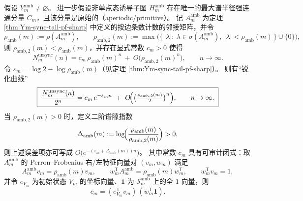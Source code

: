 \begin{theorem}\label{thm:Ym-unsync-prefix-pf-sharp}
假设 \(Y_m^{\mathrm{amb}}\neq\varnothing\)。
进一步假设非单点态诱导子图 \(H_m^{\mathrm{amb}}\) 存在唯一的最大谱半径强连通分量 \(C_m\)，且该分量是原始的（aperiodic/primitive）。
记 \(A_m^{\mathrm{amb}}\) 为定理 \ref{thm:Ym-sync-tail-pf-sharp} 中定义的按边条数计数的邻接矩阵，并令
\[
\rho_{\mathrm{amb}}(m):=\rho(A_m^{\mathrm{amb}}),\qquad
\rho_{\mathrm{amb},2}(m):=\max\bigl(\{\,|\lambda|:\ \lambda\in\sigma(A_m^{\mathrm{amb}}),\ |\lambda|<\rho_{\mathrm{amb}}(m)\,\}\cup\{0\}\bigr),
\]
则 \(\rho_{\mathrm{amb},2}(m)<\rho_{\mathrm{amb}}(m)\)，并存在显式常数 \(c_m>0\) 使得
\[
\boxed{\;
N_m^{\mathrm{unsync}}(n)
=c_m\,\rho_{\mathrm{amb}}(m)^{n}\ +\ O\!\bigl(\rho_{\mathrm{amb},2}(m)^{n}\bigr),
\qquad n\to\infty.\;}
\]
令 \(\varepsilon_m=\log 2-\log\rho_{\mathrm{amb}}(m)\)（见定理 \ref{thm:Ym-sync-tail-pf-sharp}）。
则有“锐化曲线”
\[
\boxed{\;
\frac{N_m^{\mathrm{unsync}}(n)}{2^n}
=c_m\,e^{-\varepsilon_m n}\ +\ O\!\Bigl(\bigl(\tfrac{\rho_{\mathrm{amb},2}(m)}{2}\bigr)^{n}\Bigr),
\qquad n\to\infty.\;}
\]
当 \(\rho_{\mathrm{amb},2}(m)>0\) 时，定义二阶谱隙指数
\[
\Delta_{\mathrm{amb}}(m):=\log\!\Bigl(\frac{\rho_{\mathrm{amb}}(m)}{\rho_{\mathrm{amb},2}(m)}\Bigr)>0,
\]
则上述误差项亦可写成 \(O\!\bigl(e^{-(\varepsilon_m+\Delta_{\mathrm{amb}}(m))n}\bigr)\)。
其中常数 \(c_m\) 具有可审计闭式：取 \(A_m^{\mathrm{amb}}\) 的 Perron--Frobenius 右/左特征向量对 \((v_m,w_m)\) 满足
\[
A_m^{\mathrm{amb}}v_m=\rho_{\mathrm{amb}}(m)v_m,\qquad
w_m^{\mathsf T}A_m^{\mathrm{amb}}=\rho_{\mathrm{amb}}(m)w_m^{\mathsf T},\qquad
w_m^{\mathsf T}v_m=1,
\]
并令 \(e_{V_m}\) 为初始状态 \(V_m\) 的坐标向量、\(\mathbf 1\) 为 \(\mathcal{S}_m^{\mathrm{amb}}\) 上的全 \(1\) 向量，则
\[
\boxed{\;
c_m=(e_{V_m}^{\mathsf T}v_m)\,(w_m^{\mathsf T}\mathbf 1).\;}
\]
\end{theorem}

